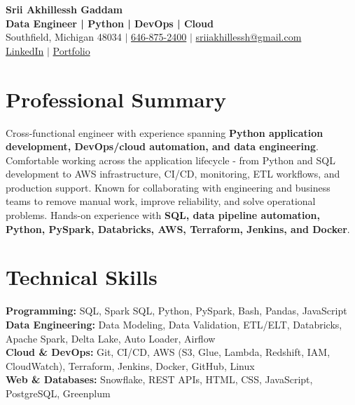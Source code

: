 \documentclass[letterpaper,10pt]{article}
\begin{document}
\fontsize{9.35pt}{10.45pt}\selectfont

\begin{center}
    {\LARGE \textbf{Srii Akhillessh Gaddam}} \\[-1pt]
    \textbf{Data Engineer | Python | DevOps | Cloud} \\[2pt]
    Southfield, Michigan 48034 $|$
    \href{tel:6468752400}{646-875-2400} $|$
    \href{mailto:sriiakhillessh@gmail.com}{sriiakhillessh@gmail.com} \\[1pt]
    \href{https://www.linkedin.com/in/srii-akhiilessh-gaddam-b48668191/}{LinkedIn} $|$
    \href{https://sriiakhillesshg.github.io/portfolio/}{Portfolio}
\end{center}
\vspace{-8pt}

\section{Professional Summary}
\small{Cross-functional engineer with experience spanning \textbf{Python application development, DevOps/cloud automation, and data engineering}. Comfortable working across the application lifecycle - from Python and SQL development to AWS infrastructure, CI/CD, monitoring, ETL workflows, and production support. Known for collaborating with engineering and business teams to remove manual work, improve reliability, and solve operational problems. Hands-on experience with \textbf{SQL, data pipeline automation, Python, PySpark, Databricks, AWS, Terraform, Jenkins, and Docker}.}

\section{Technical Skills}
\small{
\textbf{Programming:} SQL, Spark SQL, Python, PySpark, Bash, Pandas, JavaScript \\
\textbf{Data Engineering:} Data Modeling, Data Validation, ETL/ELT, Databricks, Apache Spark, Delta Lake, Auto Loader, Airflow \\
\textbf{Cloud \& DevOps:} Git, CI/CD, AWS (S3, Glue, Lambda, Redshift, IAM, CloudWatch), Terraform, Jenkins, Docker, GitHub, Linux \\
\textbf{Web \& Databases:} Snowflake, REST APIs, HTML, CSS, JavaScript, PostgreSQL, Greenplum
}

\end{document}
